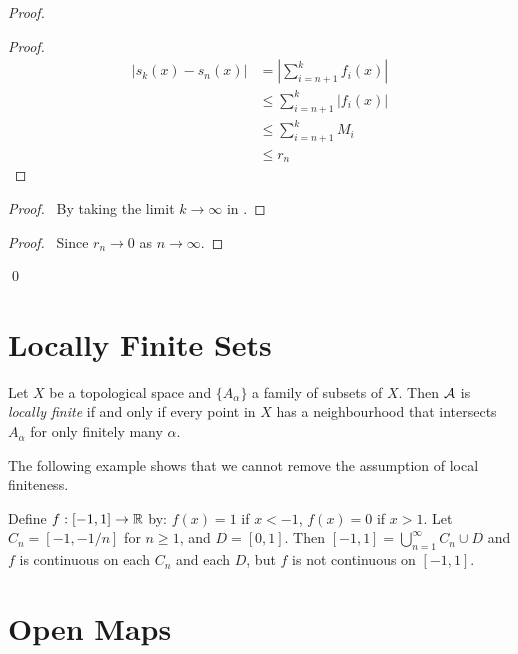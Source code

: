 \begin{proof}
    \pf
    \begin{proof}
        \pf
        \begin{align*}
            |s_k(x) - s_n(x)| & = |\sum_{i=n+1}^k f_i(x)| \\
            & \leq \sum_{i=n+1}^k |f_i(x)| \\
            & \leq \sum_{i=n+1}^k M_i \\
            & \leq r_n
        \end{align*}
    \end{proof}
    \begin{proof}
        \pf\ By taking the limit $k \rightarrow \infty$ in .
    \end{proof}
    \qedstep
    \begin{proof}
        \pf\ Since $r_n \rightarrow 0$ as $n \rightarrow \infty$.
    \end{proof}
    \qed
\end{proof}

\section{Locally Finite Sets}

\begin{definition}
    Let $X$ be a topological space and $\{ A_\alpha \}$ a family of subsets of $X$. Then $\AA$ is \emph{locally finite} if and only if every point in $X$ has a neighbourhood that
    intersects $A_\alpha$ for only finitely many $\alpha$.
\end{definition}

The following example shows that we cannot remove the assumption of local finiteness.

\begin{example}
    Define $f : [-1,1] \rightarrow \RR$ by: $f(x) = 1$ if $x < -1$, $f(x) = 0$ if $x > 1$. Let $C_n = [-1,-1/n]$ for $n \geq 1$, and $D = [0,1]$. Then
    $[-1,1] = \bigcup_{n=1}^\infty C_n \cup D$ and $f$ is continuous on each $C_n$ and each $D$, but $f$ is not continuous on $[-1,1]$.    
\end{example}

\section{Open Maps}

